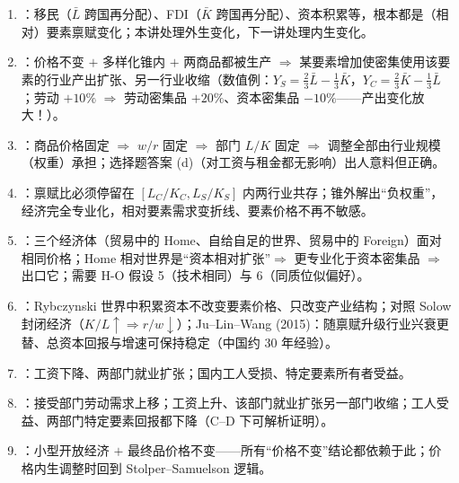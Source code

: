 \begin{sumbox}
\begin{enumerate}
  \item {}：移民（$\bar L$ 跨国再分配）、FDI（$\bar K$ 跨国再分配）、资本积累等，根本都是（相对）要素禀赋变化；本讲处理外生变化，下一讲处理内生变化。
  \item {}：价格不变 $+$ 多样化锥内 $+$ 两商品都被生产 $\Rightarrow$ 某要素增加使密集使用该要素的行业产出扩张、另一行业收缩（数值例：$Y_S = \frac{2}{3}\bar L - \frac{1}{3}\bar K$，$Y_C = \frac{2}{3}\bar K - \frac{1}{3}\bar L$；劳动 $+10\%$ $\Rightarrow$ 劳动密集品 $+20\%$、资本密集品 $-10\%$——产出变化放大！）。
  \item {}：商品价格固定 $\Rightarrow$ $w/r$ 固定 $\Rightarrow$ 部门 $L/K$ 固定 $\Rightarrow$ 调整全部由行业规模（权重）承担；选择题答案 (d)（对工资与租金都无影响）出人意料但正确。
  \item {}：禀赋比必须停留在 $[L_C/K_C, L_S/K_S]$ 内两行业共存；锥外解出``负权重''，经济完全专业化，相对要素需求变折线、要素价格不再不敏感。
  \item {}：三个经济体（贸易中的 Home、自给自足的世界、贸易中的 Foreign）面对相同价格；Home 相对世界是``资本相对扩张''$\Rightarrow$ 更专业化于资本密集品 $\Rightarrow$ 出口它；需要 H-O 假设 5（技术相同）与 6（同质位似偏好）。
  \item {}：Rybczynski 世界中积累资本不改变要素价格、只改变产业结构；对照 Solow 封闭经济（$K/L \uparrow \Rightarrow r/w \downarrow$）；Ju--Lin--Wang (2015)：随禀赋升级行业兴衰更替、总资本回报与增速可保持稳定（中国约 30 年经验）。
  \item {}：工资下降、两部门就业扩张；国内工人受损、特定要素所有者受益。
  \item {}：接受部门劳动需求上移；工资上升、该部门就业扩张另一部门收缩；工人受益、两部门特定要素回报都下降（C--D 下可解析证明）。
  \item {}：小型开放经济 $+$ 最终品价格不变——所有``价格不变''结论都依赖于此；价格内生调整时回到 Stolper--Samuelson 逻辑。
\end{enumerate}
\end{sumbox}
